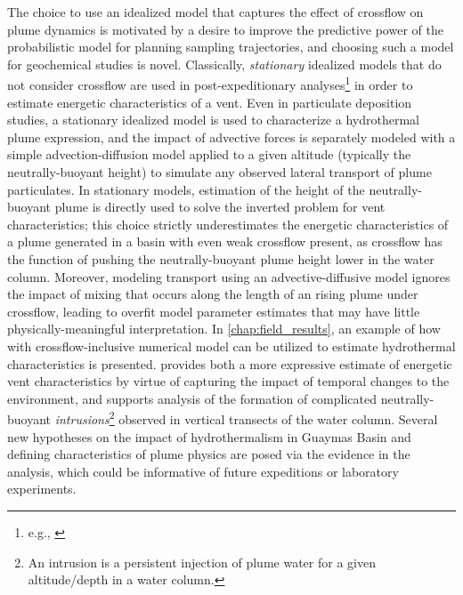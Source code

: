 The choice to use an idealized model that captures the effect of crossflow on plume dynamics is motivated by a desire to improve the predictive power of the probabilistic model for planning sampling trajectories, and choosing such a model for geochemical studies is novel.
Classically, \emph{stationary} idealized models that do not consider crossflow are used in post-expeditionary analyses\footnote{e.g., \autocite{barreyre2012structure,mittelstaedt2012quantifying,murch2020volcaniclastic}} in order to estimate energetic characteristics of a vent.
Even in particulate deposition studies, a stationary idealized model is used to characterize a hydrothermal plume expression, and the impact of advective forces is separately modeled with a simple advection-diffusion model applied to a given altitude (typically the neutrally-buoyant height) to simulate any observed lateral transport of plume particulates.
In stationary models, estimation of the height of the neutrally-buoyant plume is directly used to solve the inverted problem for vent characteristics; this choice strictly underestimates the energetic characteristics of a plume generated in a basin with even weak crossflow present, as crossflow has the function of pushing the neutrally-buoyant plume height lower in the water column.
Moreover, modeling transport using an advective-diffusive model ignores the impact of mixing that occurs along the length of an rising plume under crossflow, leading to overfit model parameter estimates that may have little physically-meaningful interpretation.
In \cref{chap:field_results}, an example of how \PHUMES with crossflow-inclusive numerical model can be utilized to estimate hydrothermal characteristics is presented.
\PHUMES provides both a more expressive estimate of energetic vent characteristics by virtue of capturing the impact of temporal changes to the environment, and supports analysis of the formation of complicated neutrally-buoyant \emph{intrusions}\footnote{An intrusion is a persistent injection of plume water for a given altitude/depth in a water column.} observed in vertical transects of the water column.
Several new hypotheses on the impact of hydrothermalism in Guaymas Basin and defining characteristics of plume physics are posed via the evidence in the analysis, which could be informative of future expeditions or laboratory experiments.



